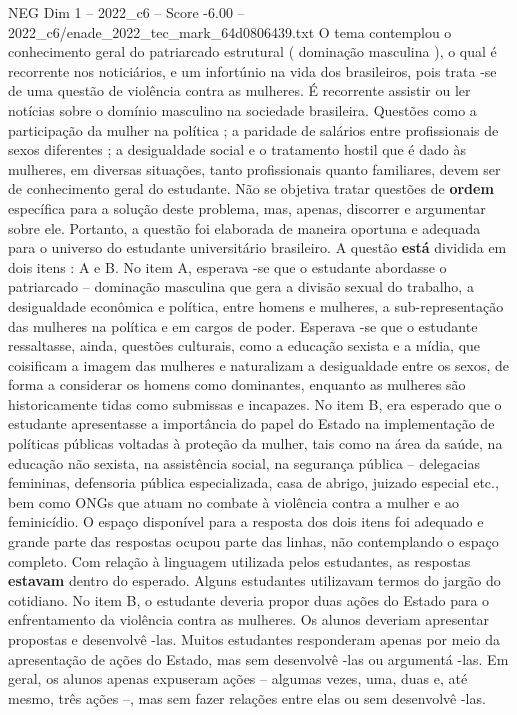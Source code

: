 \begin{textsample}{NEG Dim 1 – 2022\_c6 – Score -6.00 – 2022\_c6/enade\_2022\_tec\_mark\_64d0806439.txt}
O tema contemplou o conhecimento geral do patriarcado estrutural ( dominação masculina ), o qual é recorrente nos noticiários, e um infortúnio na vida dos brasileiros, pois trata -se de uma questão de violência contra as mulheres.
É recorrente assistir ou ler notícias sobre o domínio masculino na sociedade brasileira.
Questões como a participação da mulher na política ; a paridade de salários entre profissionais de sexos diferentes ; a desigualdade social e o tratamento hostil que é dado às mulheres, em diversas situações, tanto profissionais quanto familiares, devem ser de conhecimento geral do estudante.
Não se objetiva tratar questões de \textbf{ordem} específica para a solução deste problema, mas, apenas, discorrer e argumentar sobre ele.
Portanto, a questão foi elaborada de maneira oportuna e adequada para o universo do estudante universitário brasileiro.
A questão \textbf{está} dividida em dois itens : A e B.
No item A, esperava -se que o estudante abordasse o patriarcado – dominação masculina que gera a divisão sexual do trabalho, a desigualdade econômica e política, entre homens e mulheres, a sub-representação das mulheres na política e em cargos de poder.
Esperava -se que o estudante ressaltasse, ainda, questões culturais, como a educação sexista e a mídia, que coisificam a imagem das mulheres e naturalizam a desigualdade entre os sexos, de forma a considerar os homens como dominantes, enquanto as mulheres são historicamente tidas como submissas e incapazes.
No item B, era esperado que o estudante apresentasse a importância do papel do Estado na implementação de políticas públicas voltadas à proteção da mulher, tais como na área da saúde, na educação não sexista, na assistência social, na segurança pública – delegacias femininas, defensoria pública especializada, casa de abrigo, juizado especial etc., bem como ONGs que atuam no combate à violência contra a mulher e ao feminicídio.
O espaço disponível para a resposta dos dois itens foi adequado e grande parte das respostas ocupou parte das linhas, não contemplando o espaço completo.
Com relação à linguagem utilizada pelos estudantes, as respostas \textbf{estavam} dentro do esperado.
Alguns estudantes utilizavam termos do jargão do cotidiano.
No item B, o estudante deveria propor duas ações do Estado para o enfrentamento da violência contra as mulheres.
Os alunos deveriam apresentar propostas e desenvolvê -las.
Muitos estudantes responderam apenas por meio da apresentação de ações do Estado, mas sem desenvolvê -las ou argumentá -las.
Em geral, os alunos apenas expuseram ações – algumas vezes, uma, duas e, até mesmo, três ações –, mas sem fazer relações entre elas ou sem desenvolvê -las.

\end{textsample}
